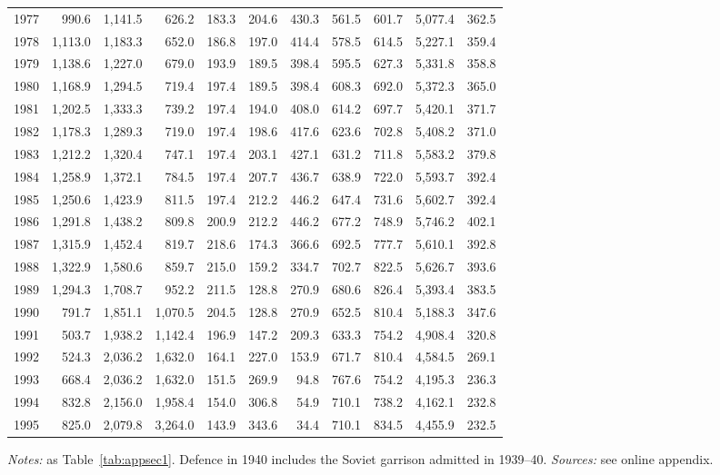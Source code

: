 \begin{longtable}{r*{10}{r}}
1977 & 990.6 & 1,141.5 & 626.2 & 183.3 & 204.6 & 430.3 & 561.5 & 601.7 & 5,077.4 & 362.5 \\
1978 & 1,113.0 & 1,183.3 & 652.0 & 186.8 & 197.0 & 414.4 & 578.5 & 614.5 & 5,227.1 & 359.4 \\
1979 & 1,138.6 & 1,227.0 & 679.0 & 193.9 & 189.5 & 398.4 & 595.5 & 627.3 & 5,331.8 & 358.8 \\
1980 & 1,168.9 & 1,294.5 & 719.4 & 197.4 & 189.5 & 398.4 & 608.3 & 692.0 & 5,372.3 & 365.0 \\
1981 & 1,202.5 & 1,333.3 & 739.2 & 197.4 & 194.0 & 408.0 & 614.2 & 697.7 & 5,420.1 & 371.7 \\
1982 & 1,178.3 & 1,289.3 & 719.0 & 197.4 & 198.6 & 417.6 & 623.6 & 702.8 & 5,408.2 & 371.0 \\
1983 & 1,212.2 & 1,320.4 & 747.1 & 197.4 & 203.1 & 427.1 & 631.2 & 711.8 & 5,583.2 & 379.8 \\
1984 & 1,258.9 & 1,372.1 & 784.5 & 197.4 & 207.7 & 436.7 & 638.9 & 722.0 & 5,593.7 & 392.4 \\
1985 & 1,250.6 & 1,423.9 & 811.5 & 197.4 & 212.2 & 446.2 & 647.4 & 731.6 & 5,602.7 & 392.4 \\
1986 & 1,291.8 & 1,438.2 & 809.8 & 200.9 & 212.2 & 446.2 & 677.2 & 748.9 & 5,746.2 & 402.1 \\
1987 & 1,315.9 & 1,452.4 & 819.7 & 218.6 & 174.3 & 366.6 & 692.5 & 777.7 & 5,610.1 & 392.8 \\
1988 & 1,322.9 & 1,580.6 & 859.7 & 215.0 & 159.2 & 334.7 & 702.7 & 822.5 & 5,626.7 & 393.6 \\
1989 & 1,294.3 & 1,708.7 & 952.2 & 211.5 & 128.8 & 270.9 & 680.6 & 826.4 & 5,393.4 & 383.5 \\
1990 & 791.7 & 1,851.1 & 1,070.5 & 204.5 & 128.8 & 270.9 & 652.5 & 810.4 & 5,188.3 & 347.6 \\
1991 & 503.7 & 1,938.2 & 1,142.4 & 196.9 & 147.2 & 209.3 & 633.3 & 754.2 & 4,908.4 & 320.8 \\
1992 & 524.3 & 2,036.2 & 1,632.0 & 164.1 & 227.0 & 153.9 & 671.7 & 810.4 & 4,584.5 & 269.1 \\
1993 & 668.4 & 2,036.2 & 1,632.0 & 151.5 & 269.9 & 94.8 & 767.6 & 754.2 & 4,195.3 & 236.3 \\
1994 & 832.8 & 2,156.0 & 1,958.4 & 154.0 & 306.8 & 54.9 & 710.1 & 738.2 & 4,162.1 & 232.8 \\
1995 & 825.0 & 2,079.8 & 3,264.0 & 143.9 & 343.6 & 34.4 & 710.1 & 834.5 & 4,455.9 & 232.5 \\
\end{longtable}
\vspace{-1.2em}\noindent\begin{minipage}{\textwidth}\footnotesize \textit{Notes:} as Table~\ref{tab:appsec1}. Defence in 1940 includes the Soviet garrison admitted in 1939--40. \textit{Sources:} see online appendix.\end{minipage}\vspace{1em}

